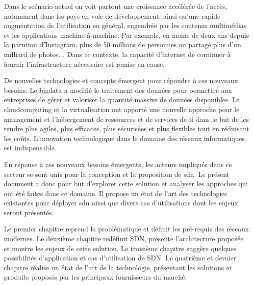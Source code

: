 \par
Dans le scénario actuel on voit 
partout une croissance accélérée de l'accès, notamment dans les pays en voie de développement, ainsi qu'une rapide augmentation de l'utilisation en général, engendrée par les contenus multimédias et les applications machine-à-machine. Par exemple, en moins de deux ans depuis la parution d'Instagram, plus de 50 millions de personnes on partagé plus d'un milliard de photos. \cite{deuxAnsInstagram}.
Dans ce contexte, la capacité d'internet de continuer à fournir l'infrastructure nécessaire est remise en cause. \cite{InternetSustainGrowthIntro}
\par
De nouvelles technologies et concepts émergent pour répondre à ces nouveaux besoins.
Le \gls{bigdata} a modifié le traitement des données pour permettre aux entreprises de gérer et valoriser la quantité massive de données disponibles. \cite{IMBigData} Le \gls{cloudcomputing} et la \gls{virtualisation} ont apporté une nouvelle approche pour le management et l'hébergement de ressources et de services de \gls{ti}  dans le but de les rendre plus agiles, plus efficaces, plus sécurisées et plus flexibles tout en réduisant les coûts. \cite{CloudComputingIntelVision} 
L'innovation technologique dans le domaine des réseaux informatiques est indispensable. \cite{InternetEvolutionRoleSoftwareEngineeringConclusion}
\par
En réponse à ces nouveaux besoins émergents, les acteurs impliqués dans ce secteur se sont unis pour la conception et la proposition de \gls{sdn}.
Le présent document a donc pour but d'explorer cette solution et analyser les approches qui ont été faites dans ce domaine. Il propose un état de l'art des technologies existantes pour déployer \gls{sdn} ainsi que divers cas d'utilisations dont les enjeux seront présentés.
\par
Le premier chapitre reprend la problématique et définit les pré-requis des réseaux modernes. Le deuxième chapitre redéfinit SDN, présente l'architecture proposée et montre les enjeux de cette solution. Le troisième chapitre suggère quelques possibilités d'application et cas d'utilisation de SDN. Le quatrième et dernier chapitre réalise un état de l'art de la technologie, présentant les solutions et produits proposés par les principaux fournisseurs du marché.


